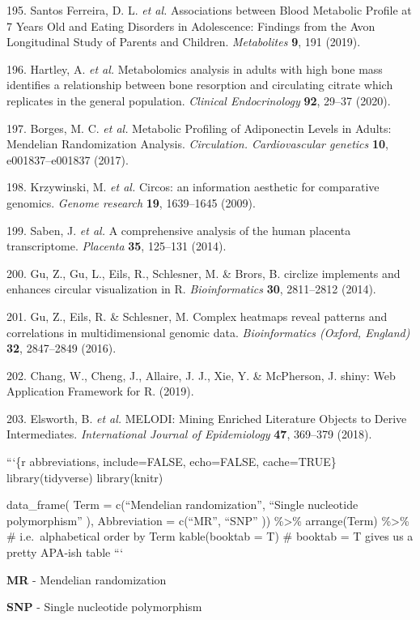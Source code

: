\documentclass[11pt,twoside]{bristolthesis}
\begin{document}
\leavevmode\hypertarget{ref-SantosFerreira2019}{}%
195. Santos Ferreira, D. L. \emph{et al.} Associations between Blood Metabolic Profile at 7 Years Old and Eating Disorders in Adolescence: Findings from the Avon Longitudinal Study of Parents and Children. \emph{Metabolites} \textbf{9}, 191 (2019).

\leavevmode\hypertarget{ref-Hartley2020}{}%
196. Hartley, A. \emph{et al.} Metabolomics analysis in adults with high bone mass identifies a relationship between bone resorption and circulating citrate which replicates in the general population. \emph{Clinical Endocrinology} \textbf{92}, 29--37 (2020).

\leavevmode\hypertarget{ref-Borges2017}{}%
197. Borges, M. C. \emph{et al.} Metabolic Profiling of Adiponectin Levels in Adults: Mendelian Randomization Analysis. \emph{Circulation. Cardiovascular genetics} \textbf{10}, e001837--e001837 (2017).

\leavevmode\hypertarget{ref-Krzywinski2009}{}%
198. Krzywinski, M. \emph{et al.} Circos: an information aesthetic for comparative genomics. \emph{Genome research} \textbf{19}, 1639--1645 (2009).

\leavevmode\hypertarget{ref-Saben2014}{}%
199. Saben, J. \emph{et al.} A comprehensive analysis of the human placenta transcriptome. \emph{Placenta} \textbf{35}, 125--131 (2014).

\leavevmode\hypertarget{ref-Gu2014}{}%
200. Gu, Z., Gu, L., Eils, R., Schlesner, M. \& Brors, B. circlize implements and enhances circular visualization in R. \emph{Bioinformatics} \textbf{30}, 2811--2812 (2014).

\leavevmode\hypertarget{ref-Gu2016}{}%
201. Gu, Z., Eils, R. \& Schlesner, M. Complex heatmaps reveal patterns and correlations in multidimensional genomic data. \emph{Bioinformatics (Oxford, England)} \textbf{32}, 2847--2849 (2016).

\leavevmode\hypertarget{ref-Chang2019}{}%
202. Chang, W., Cheng, J., Allaire, J. J., Xie, Y. \& McPherson, J. shiny: Web Application Framework for R. (2019).

\leavevmode\hypertarget{ref-Elsworth2018}{}%
203. Elsworth, B. \emph{et al.} MELODI: Mining Enriched Literature Objects to Derive Intermediates. \emph{International Journal of Epidemiology} \textbf{47}, 369--379 (2018).
  \begin{abbreviations}
    ```\{r abbreviations, include=FALSE, echo=FALSE, cache=TRUE\}
    library(tidyverse)
    library(knitr)
    
    data\_frame(
    Term = c(``Mendelian randomization'',
    ``Single nucleotide polymorphism''
    ),
    Abbreviation = c(``MR'',
    ``SNP''
    )) \%\textgreater{}\%
    arrange(Term) \%\textgreater{}\% \# i.e.~alphabetical order by Term
    kable(booktab = T) \# booktab = T gives us a pretty APA-ish table
    ```
    
    \textbf{MR} - Mendelian randomization
    
    \textbf{SNP} - Single nucleotide polymorphism
  \end{abbreviations}
\end{document}
